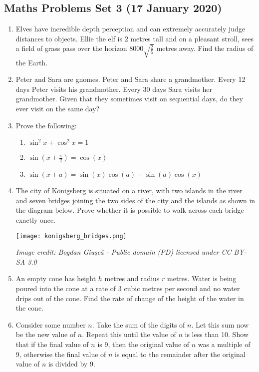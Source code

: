 \documentclass{article}
\begin{document}
\begin{center}
        \section*{Maths Problems Set 3 (17 January 2020)}
\end{center}

\begin{enumerate}
    \item
    Elves have incredible depth perception and can extremely accurately judge distances to objects. Ellie the elf is $2$ metres tall and on a pleasant stroll, sees a field of grass pass over the horizon $8000 \sqrt{\frac{2}{5}}$ metres away. Find the radius of the Earth.

    \item
    Peter and Sara are gnomes. Peter and Sara share a grandmother. Every 12 days Peter visits his grandmother. Every 30 days Sara visits her grandmother. Given that they sometimes visit on sequential days, do they ever visit on the same day?
    
    \item
    Prove the following:
    \begin{enumerate}
        \item $\sin^2 x + \cos^2 x = 1$
        \item $\sin(x + \frac{\pi}{2}) = \cos(x)$
        \item $\sin(x + a) = \sin (x) \cos (a) + \sin (a) \cos (x)$
    \end{enumerate}
    
    \item
    The city of Königsberg is situated on a river, with two islands in the river and seven bridges joining the two sides of the city and the islands as shown in the diagram below. Prove whether it is possible to walk across each bridge exactly once.
    
    \texttt{[image: konigsberg\_bridges.png]}
    
    \textit{Image credit: Bogdan Giuşcă - Public domain (PD) licensed under CC BY-SA 3.0}
    
    \item
    An empty cone has height $h$ metres and radius $r$ metres. Water is being poured into the cone at a rate of 3 cubic metres per second and no water drips out of the cone. Find the rate of change of the height of the water in the cone.

    \item
    Consider some number $n$. Take the sum of the digits of $n$. Let this sum now be the new value of $n$. Repeat this until the value of $n$ is less than 10. Show that if the final value of $n$ is 9, then the original value of $n$ was a multiple of 9, otherwise the final value of $n$ is equal to the remainder after the original value of $n$ is divided by 9.
    

\end{enumerate}
\end{document}

